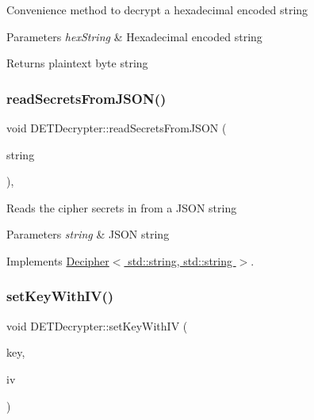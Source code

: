 Convenience method to decrypt a hexadecimal encoded string 
\begin{DoxyParams}{Parameters}
{\em hex\+String} & Hexadecimal encoded string \\
\hline
\end{DoxyParams}
\begin{DoxyReturn}{Returns}
plaintext byte string 
\end{DoxyReturn}
\mbox{\label{classDETDecrypter_a8e32703400ead9c35a80549b011307d7}} 
\subsubsection{\texorpdfstring{read\+Secrets\+From\+J\+S\+O\+N()}{readSecretsFromJSON()}}
{\footnotesize\ttfamily void D\+E\+T\+Decrypter\+::read\+Secrets\+From\+J\+S\+ON (\begin{DoxyParamCaption}\item[{std\+::string \&}]{string }\end{DoxyParamCaption})\hspace{0.3cm}{\ttfamily [override]}, {\ttfamily [virtual]}}

Reads the cipher secrets in from a J\+S\+ON string 
\begin{DoxyParams}{Parameters}
{\em string} & J\+S\+ON string \\
\hline
\end{DoxyParams}


Implements \hyperlink{classDecipher_a39aea002012130201e12a8fa7d84dda5}{Decipher$<$ std\+::string, std\+::string $>$}.

\mbox{\label{classDETDecrypter_aef2cdd9235fb7d927ab4992fec6efe78}} 
\subsubsection{\texorpdfstring{set\+Key\+With\+I\+V()}{setKeyWithIV()}\hspace{0.1cm}{\footnotesize\ttfamily [1/2]}}
{\footnotesize\ttfamily void D\+E\+T\+Decrypter\+::set\+Key\+With\+IV (\begin{DoxyParamCaption}\item[{Crypto\+P\+P\+::\+Sec\+Byte\+Block \&}]{key,  }\item[{Crypto\+P\+P\+::\+Sec\+Byte\+Block \&}]{iv }\end{DoxyParamCaption})}

